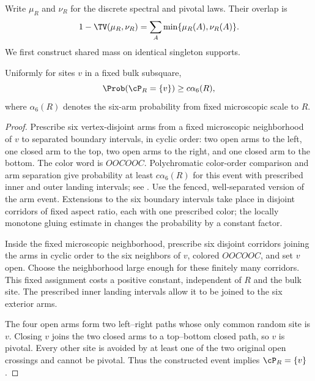 Write $\mu_R$ and $\nu_R$ for the discrete spectral and pivotal laws. Their overlap is
\begin{equation}\label{eq:overlap}
 1-\TV(\mu_R,\nu_R)=\sum_A\min\{\mu_R(A),\nu_R(A)\}.
\end{equation}
We first construct shared mass on identical singleton supports.

\begin{lemma}\label{lem:singlepiv}
Uniformly for sites $v$ in a fixed bulk subsquare,
\[
 \Prob(\cP_R=\{v\})\ge c\alpha_6(R),
\]
where $\alpha_6(R)$ denotes the six-arm probability from fixed microscopic scale to $R$.
\end{lemma}
\begin{proof}
Prescribe six vertex-disjoint arms from a fixed microscopic neighborhood of $v$ to separated boundary intervals, in cyclic order: two open arms to the left, one closed arm to the top, two open arms to the right, and one closed arm to the bottom. The color word is $OOCOOC$. Polychromatic color-order comparison and arm separation give probability at least $c\alpha_6(R)$ for this event with prescribed inner and outer landing intervals; see \cite[Theorem~11, equation~(4.8), Proposition~12, and Proposition~20, equation~(5.2)]{Nolin}. Use the fenced, well-separated version of the arm event. Extensions to the six boundary intervals take place in disjoint corridors of fixed aspect ratio, each with one prescribed color; the locally monotone gluing estimate in \cite[Proposition~12]{Nolin} changes the probability by a constant factor.

Inside the fixed microscopic neighborhood, prescribe six disjoint corridors joining the arms in cyclic order to the six neighbors of $v$, colored $OOCOOC$, and set $v$ open. Choose the neighborhood large enough for these finitely many corridors. This fixed assignment costs a positive constant, independent of $R$ and the bulk site. The prescribed inner landing intervals allow it to be joined to the six exterior arms.

The four open arms form two left--right paths whose only common random site is $v$. Closing $v$ joins the two closed arms to a top--bottom closed path, so $v$ is pivotal. Every other site is avoided by at least one of the two original open crossings and cannot be pivotal. Thus the constructed event implies $\cP_R=\{v\}$.
\end{proof}

